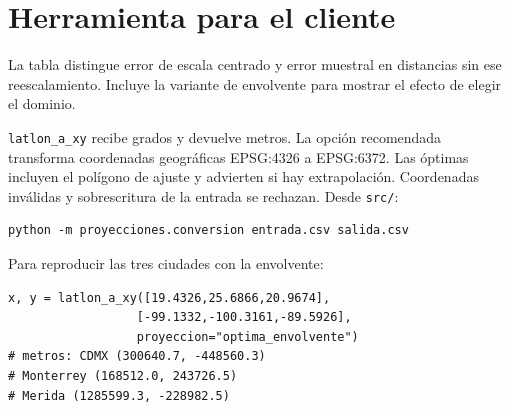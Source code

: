 \section{Herramienta para el cliente}
La tabla distingue error de escala centrado y error muestral en distancias sin ese reescalamiento. Incluye la variante de envolvente para mostrar el efecto de elegir el dominio.
\begin{table}[htbp]\centering
\resizebox{\linewidth}{!}{}
\caption{Comparación esférica. Distancias nacionales absolutas y cambios de k-means con $k=20$, mediana de diez semillas. Fuente: resultados reproducidos del repositorio con datos de INEGI.}\label{tab:comparativa}
\end{table}

\texttt{latlon\_a\_xy} recibe grados y devuelve metros. La opción recomendada transforma coordenadas geográficas EPSG:4326 a EPSG:6372. Las óptimas incluyen el polígono de ajuste y advierten si hay extrapolación. Coordenadas inválidas y sobrescritura de la entrada se rechazan. Desde \texttt{src/}:
\begin{lstlisting}
python -m proyecciones.conversion entrada.csv salida.csv
\end{lstlisting}
Para reproducir las tres ciudades con la envolvente:
\begin{lstlisting}
x, y = latlon_a_xy([19.4326,25.6866,20.9674],
                  [-99.1332,-100.3161,-89.5926],
                  proyeccion="optima_envolvente")
# metros: CDMX (300640.7, -448560.3)
# Monterrey (168512.0, 243726.5)
# Merida (1285599.3, -228982.5)
\end{lstlisting}
